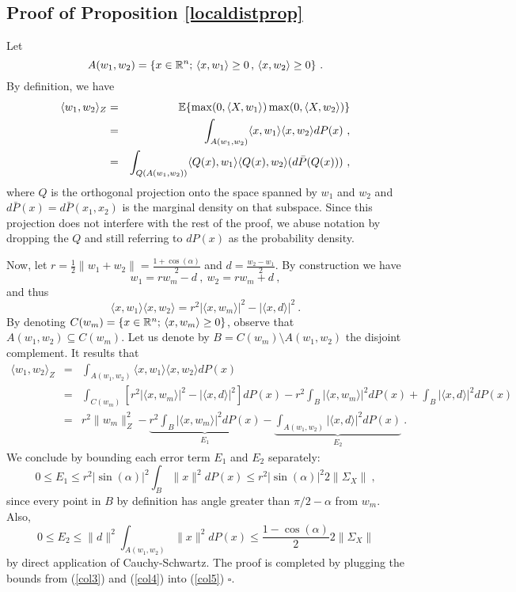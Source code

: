 \subsection{Proof of Proposition \ref{localdistprop}}

Let 
$$A(w_1, w_2) = \{ x \in {\mathbb{R}}^n; \, \langle x, w_1 \rangle \geq 0\,,\, \langle x, w_2 \rangle \geq 0\}~.$$
By definition, we have 
\begin{eqnarray}
\label{col1}
\langle w_1, w_2 \rangle_Z &=& {\mathbb{E}} \{ \max(0, \langle X, w_1 \rangle ) \max(0, \langle X, w_2 \rangle ) \} \\
&=& \int_{A(w_1, w_2)} \langle x, w_1 \rangle  \langle x, w_2 \rangle dP(x)~, \\
&=& \int_{Q({A}(w_1, w_2))}  \langle Q(x), w_1 \rangle  \langle Q(x), w_2 \rangle (d\bar{P}(Q(x)))~,  
\end{eqnarray}
where $Q$ is the orthogonal projection onto the space spanned by $w_1$ and $w_2$ and
 $d\bar{P}(x)=d\bar{P}(x_1, x_2)$ is the marginal density on that subspace. 
 Since this projection does not interfere with the rest of the proof, we abuse notation by dropping the $Q$ and still referring to $dP(x)$ as the probability density.

Now, let $r = \frac{1}{2}\| w_1 + w_2 \| = \frac{1 + \cos(\alpha)}{2}$ and $d = \frac{w_2 - w_1}{2}$.
By construction we have 
$$w_1 = r w_m - d~,~ w_2 = r w_m + d~,$$
and thus 
\begin{equation}
\label{col2}
\langle x, w_1 \rangle  \langle x, w_2 \rangle = r^2 | \langle x, w_m \rangle |^2 - | \langle x, d \rangle |^2~.
\end{equation}
By denoting $C(w_m) = \{ x \in {\mathbb{R}}^n;\, \langle x, w_m \rangle \geq 0 \}$, 
observe that $A(w_1, w_2 ) \subseteq C(w_m)$. Let us denote by $B = C(w_m) \setminus A(w_1, w_2) $ the disjoint complement. It results that 
\begin{eqnarray}
\label{col5}
\langle w_1, w_2 \rangle_Z &=& \int_{A(w_1, w_2)} \langle x, w_1 \rangle  \langle x, w_2 \rangle dP(x) \nonumber \\
&=& \int_{C(w_m)} [r^2 | \langle x, w_m \rangle |^2 - | \langle x, d \rangle |^2 ] dP(x) - r^2 \int_B  | \langle x, w_m \rangle |^2 dP(x) + \int_B  | \langle x, d \rangle |^2  dP(x) \nonumber \\ 
&=& r^2 \| w_m \|_Z^2 - \underbrace{ r^2 \int_B  | \langle x, w_m \rangle |^2 dP(x)}_{E_1} - \underbrace{\int_{A(w_1, w_2)} | \langle x, d \rangle |^2  dP(x) }_{E_2}~. 
\end{eqnarray} 
We conclude by bounding each error term $E_1$ and $E_2$ separately:
\begin{equation}
\label{col3}
0 \leq E_1 \leq r^2 |\sin(\alpha)|^2 \int_B \| x \|^2 dP(x) \leq r^2 |\sin(\alpha)|^2 2 \| \Sigma_X\|~,
\end{equation}
since every point in $B$ by definition has angle greater than $\pi/2 - \alpha$ from $w_m$. Also,
\begin{equation}
\label{col4}
0 \leq E_2 \leq \|d \|^2 \int_{A(w_1, w_2)} \| x \|^2 dP(x) \leq \frac{1 - \cos(\alpha)}{2} 2 \| \Sigma_X \|
\end{equation}
by direct application of Cauchy-Schwartz. The proof is completed by plugging the bounds from (\ref{col3}) and (\ref{col4}) into (\ref{col5})  $\square$.



